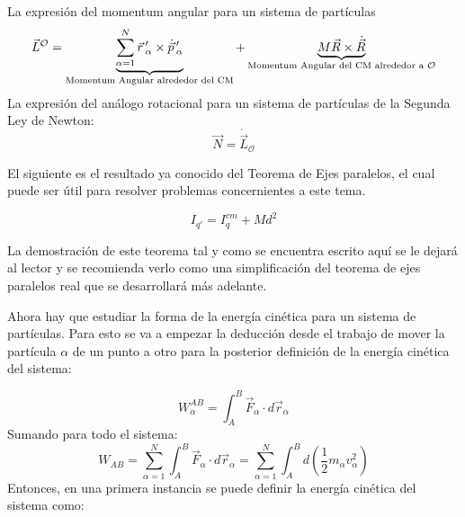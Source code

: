 \documentclass[/home/hernan/Documentos/Apuntes_mecanica_teorica/main.tex]{subfiles}
\begin{document}
	\begin{definition}
		La expresión del momentum angular para un sistema de partículas
		\begin{equation}
			\vec{L}^{\mathcal{O}} = \underbrace{\sum_{\alpha =1}^{N} {\vec{r}}\,'_{\alpha} \times {\dot{\vec{p}}}\,'_{\alpha}}_{\textup{Momentum Angular alrededor del CM}} + \underbrace{M \vec{R} \times \dot{\vec{R}}}_{\textup{Momentum Angular del CM alrededor a $\mathcal{O}$}}
			\label{eq: sismomentumA}
		\end{equation}
		La expresión del análogo rotacional para un sistema de partículas de la Segunda Ley de Newton:
		\begin{equation}
			\vec{N} = \dot{\vec{L}}_{\mathcal{O}}
			\label{eq: sisNSecondlawrot}
		\end{equation}
	\end{definition}

	El siguiente es el resultado ya conocido del Teorema de Ejes paralelos, el cual puede ser útil para resolver problemas concernientes a este tema.

	\begin{theorem}
		\begin{equation}
			I_{{q}'}= I_{q}^{cm} + Md^{2}
		\end{equation}

		La demostración de este teorema tal y como se encuentra escrito aquí se le dejará al lector y se recomienda verlo como una simplificación del teorema de ejes paralelos real que se desarrollará más adelante.
	\end{theorem}

	Ahora hay que estudiar la forma de la energía cinética para un sistema de partículas. Para esto se va a empezar la deducción desde el trabajo de mover la partícula $\alpha$ de un punto a otro para la posterior definición de la energía cinética del sistema: 

	\begin{equation*}
		W_{\alpha}^{AB} = \int_{A}^{B} \vec{F}_{\alpha} \cdot d\vec{r}_{\alpha}
	\end{equation*}
	Sumando para todo el sistema: 
	\begin{equation*}
		W_{AB} = \sum_{\alpha = 1}^{N} \int_{A}^{B} \vec{F}_{\alpha} \cdot d\vec{r}_{\alpha} = \sum_{\alpha = 1}^{N} \int_{A}^{B} d\left(\frac{1}{2} m_{\alpha}v_{\alpha}^{2}\right)
	\end{equation*}
	Entonces, en una primera instancia se puede definir la energía cinética del sistema como:
\end{document}
